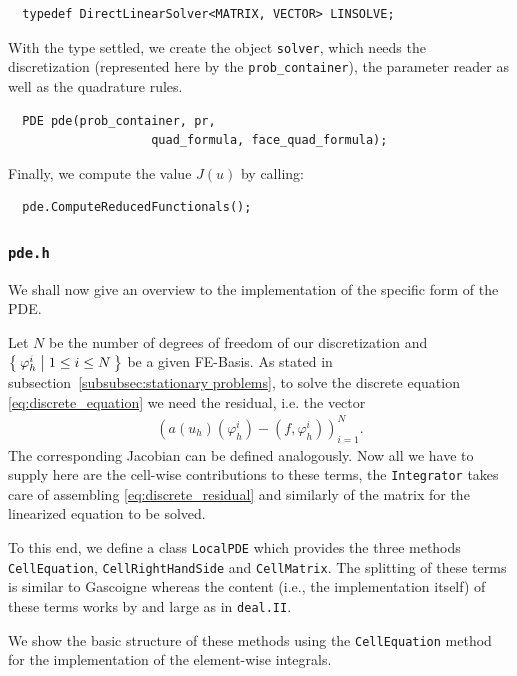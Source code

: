 \documentclass[smallextended]{svjour3}       %
\numberwithin{equation}{section}
\renewcommand{\phi}{\varphi}
\newcommand{\deal}{\texttt{deal.II}}
\begin{document}
\begin{lstlisting}
  typedef DirectLinearSolver<MATRIX, VECTOR> LINSOLVE;
\end{lstlisting}
With the type settled, we create the object \texttt{solver}, which needs the discretization (represented here by the \texttt{prob\_container}), the parameter reader as well as the quadrature rules.
\begin{lstlisting}
  PDE pde(prob_container, pr,
                    quad_formula, face_quad_formula);
\end{lstlisting}
Finally, we compute the value $J(u)$ by calling:
\begin{lstlisting}
  pde.ComputeReducedFunctionals();
\end{lstlisting}

\subsubsection{\texttt{pde.h}}
We shall now give an overview to the implementation of the specific form of the PDE. 

Let $N$ be the number of degrees of freedom of our discretization and $\Set{\phi_{h}^{i}|1\leq i \leq N}$ be a given FE-Basis. As stated in subsection~\ref{subsubsec:stationary problems}, to solve the discrete equation \eqref{eq:discrete_equation} we need the residual, i.e. the vector
\begin{align}\label{eq:discrete_residual}
\left(a(u_h)(\phi_{h}^{i})-(f,\phi_{h}^{i})\right)_{i=1}^N.
\end{align}
The corresponding Jacobian can be defined analogously.
Now all we have to supply here are the cell-wise contributions to these terms, the \texttt{Integrator} takes care of assembling \eqref{eq:discrete_residual}
and similarly of the matrix for the linearized equation to be solved.

To this end, we define a class \texttt{LocalPDE} which provides the three methods
\texttt{CellEquation}, \texttt{CellRightHandSide} and \texttt{CellMatrix}. 
The splitting of these terms is similar to Gascoigne
\cite{gascoigne} whereas the content (i.e., the 
implementation itself) of these
terms works by and large as in \deal{}. 


We show the basic structure of these methods using the \texttt{CellEquation} 
method for the implementation of the element-wise integrals.
\end{document}
